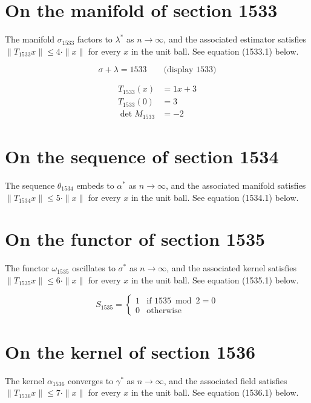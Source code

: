 \documentclass{article}
\begin{document}
\section{On the manifold of section 1533}
The manifold $\sigma_{1533}$ factors to $\lambda^{*}$ as $n \to \infty$,
and the associated estimator satisfies $\|T_{1533} x\| \leq 4 \cdot \|x\|$
for every $x$ in the unit ball. See equation (1533.1) below.

$$
\sigma + \lambda = 1533 \qquad \text{(display 1533)}
$$

\begin{align}
T_{1533}(x) &= 1 x + 3 \\
T_{1533}(0) &= 3 \\
\det M_{1533} &= -2
\end{align}

\section{On the sequence of section 1534}
The sequence $\theta_{1534}$ embeds to $\alpha^{*}$ as $n \to \infty$,
and the associated manifold satisfies $\|T_{1534} x\| \leq 5 \cdot \|x\|$
for every $x$ in the unit ball. See equation (1534.1) below.

\section{On the functor of section 1535}
The functor $\omega_{1535}$ oscillates to $\sigma^{*}$ as $n \to \infty$,
and the associated kernel satisfies $\|T_{1535} x\| \leq 6 \cdot \|x\|$
for every $x$ in the unit ball. See equation (1535.1) below.

\begin{equation}
S_{1535} = \begin{cases} 1 & \text{if } 1535 \bmod 2 = 0 \\ 0 & \text{otherwise} \end{cases}
\end{equation}

\section{On the kernel of section 1536}
The kernel $\alpha_{1536}$ converges to $\gamma^{*}$ as $n \to \infty$,
and the associated field satisfies $\|T_{1536} x\| \leq 7 \cdot \|x\|$
for every $x$ in the unit ball. See equation (1536.1) below.
\end{document}
